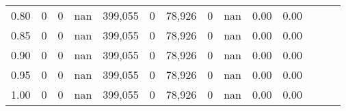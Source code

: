 \begin{tabular}{rrrrrrrrrrrrrr}
0.80 &        0 &       0 &   nan &  399,055 &        0 &  78,926 &       0 &   nan &  0.00 &      0.00 \\
0.85 &        0 &       0 &   nan &  399,055 &        0 &  78,926 &       0 &   nan &  0.00 &      0.00 \\
0.90 &        0 &       0 &   nan &  399,055 &        0 &  78,926 &       0 &   nan &  0.00 &      0.00 \\
0.95 &        0 &       0 &   nan &  399,055 &        0 &  78,926 &       0 &   nan &  0.00 &      0.00 \\
1.00 &        0 &       0 &   nan &  399,055 &        0 &  78,926 &       0 &   nan &  0.00 &      0.00 \\
\bottomrule
\end{tabular}
